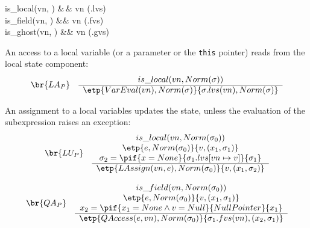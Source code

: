 \begin{haskell}
is\_local(vn, \sigma) &\eqdef\,& vn \in \dom(\sigma.lvs)\\
is\_field(vn, \sigma) &\eqdef& vn \in \dom(\sigma.fvs)\\
is\_ghost(vn, \sigma) &\eqdef& vn \in \dom(\sigma.gvs)
\end{haskell}


An access to a local variable (or a parameter or the \texttt{this} pointer) reads from the local state
component:
\begin{displaymath}
\begin{array}{lc}
\br{LA_P}     &
\begin{array}{c}
is\_local(vn, Norm(\sigma))\\
\hline
\etp{VarEval(vn), Norm(\sigma)}{\sigma.lvs(vn), Norm(\sigma)}
\end{array}
\end{array}
\end{displaymath}

An assignment to a local variables updates the state, unless the evaluation of the subexpression raises an
exception:
\begin{displaymath}
\begin{array}{lc}
\br{LU_P}     &
\begin{array}{c}
is\_local(vn, Norm(\sigma_0))\\
\etp{e, Norm(\sigma_0)}{v, (x_1, \sigma_1)}\\
\sigma_2 = \pif{x = None}{\sigma_1.lvs[vn \mapsto v]}{\sigma_1}\\
\hline
\etp{LAssign(vn, e), Norm(\sigma_0)}{v, (x_1, \sigma_2)}
\end{array}
\end{array}
\end{displaymath}


\begin{displaymath}
\begin{array}{lc}
\br{QA_P}     &
\begin{array}{c}
is\_field(vn, Norm(\sigma_0))\\
\etp{e, Norm(\sigma_0)}{v, (x_1, \sigma_1)}\\
x_2 = \pif{x_1 = None \wedge v = Null}{NullPointer}{x_1}\\
\hline
\etp{QAccess(e, vn), Norm(\sigma_0)}{\sigma_1.fvs(vn), (x_2, \sigma_1)}
\end{array}
\end{array}
\end{displaymath}

